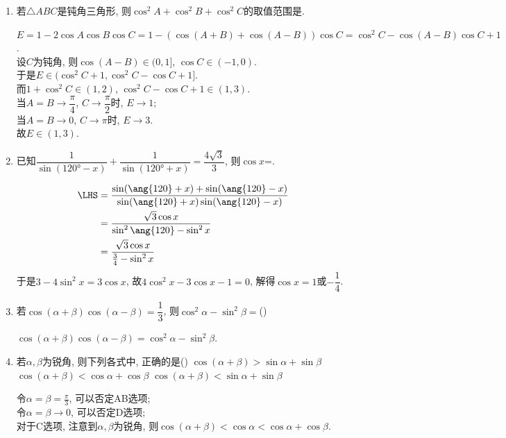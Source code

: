 \begin{enumerate}
\item 若$\triangle{ABC}$是钝角三角形, 则$\cos^2A+\cos^2B+\cos^2C$的取值范围是. 
\begin{jieda}
$E=1-2\cos{A}\cos{B}\cos{C}=1-(\cos(A+B)+\cos(A-B))\cos{C}=\cos^2C-\cos(A-B)\cos{C}+1$. \\
设$C$为钝角, 则$\cos(A-B)\in(0,1]$, $\cos{C}\in(-1,0)$. \\
于是$E\in(\cos^2C+1,\cos^2C-\cos{C}+1]$. \\
而$1+\cos^2C\in(1,2)$, $\cos^2C-\cos{C}+1\in(1,3)$. \\
当$A=B\to\dfrac{\pi}{4}$, $C\to\dfrac{\pi}{2}$时, $E\to 1$; \\
当$A=B\to0$, $C\to\pi$时, $E\to 3$. \\
故$E\in(1,3)$. 
\end{jieda}


\item 已知$\dfrac{1}{\sin(\ang{120}-x)}+\dfrac{1}{\sin(\ang{120}+x)}=\dfrac{4\sqrt{3}}{3}$, 则$\cos{x}$=. 
\begin{jieda}
\begin{align*}
\LHS & = \dfrac{\sin(\ang{120}+x)+\sin(\ang{120}-x)}{\sin(\ang{120}+x)\sin(\ang{120}-x)}\\
& = \dfrac{\sqrt{3}\cos{x}}{\sin^2\ang{120}-\sin^2x}\\
& = \dfrac{\sqrt{3}\cos{x}}{\frac{3}{4}-\sin^2x}
\end{align*}
于是$3-4\sin^2x=3\cos{x}$, 故$4\cos^2x-3\cos{x}-1=0$, 解得$\cos{x}=1$或$-\dfrac{1}{4}$. 
\end{jieda}

\item 若$\cos(\alpha+\beta)\cos(\alpha-\beta)=\dfrac{1}{3}$, 则$\cos^2\alpha-\sin^2\beta=$\dotfill()
\begin{jieda}
$\cos(\alpha+\beta)\cos(\alpha-\beta)=\cos^2\alpha-\sin^2\beta$. 
\end{jieda}

\item 若$\alpha,\beta$为锐角, 则下列各式中, 正确的是\dotfill()
\xx{$\cos(\alpha+\beta)>\cos\alpha+\cos\beta$}
{$\cos(\alpha+\beta)>\sin\alpha+\sin\beta$}
{$\cos(\alpha+\beta)<\cos\alpha+\cos\beta$}
{$\cos(\alpha+\beta)<\sin\alpha+\sin\beta$}
\begin{jieda}
令$\alpha=\beta=\frac{\pi}{3}$, 可以否定AB选项; \\
令$\alpha=\beta\to0$, 可以否定D选项; \\
对于C选项, 注意到$\alpha,\beta$为锐角, 则$\cos(\alpha+\beta)<\cos\alpha<\cos\alpha+\cos\beta$. 
\end{jieda}



\end{enumerate}
